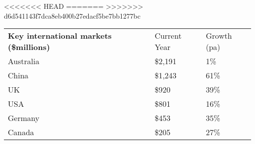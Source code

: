 <<<<<<< HEAD
=======
>>>>>>> d6d541143f7dca8eb400b27edacf5be7bb1277bc
\begin{tabular}[t]{p{4.85cm}>{\hfill}p{1.3cm}>{\hfill}p{1.35cm}}
 \textbf{Key international markets (\$millions)} & Current Year & Growth (pa) \\ 
 Australia & \$2,191 & 1\% \\ 
  China & \$1,243 & 61\% \\ 
  UK & \$920   & 39\% \\ 
  USA & \$801   & 16\% \\ 
  Germany & \$453   & 35\% \\ 
  Canada & \$205   & 27\% \\ 
  \end{tabular}
